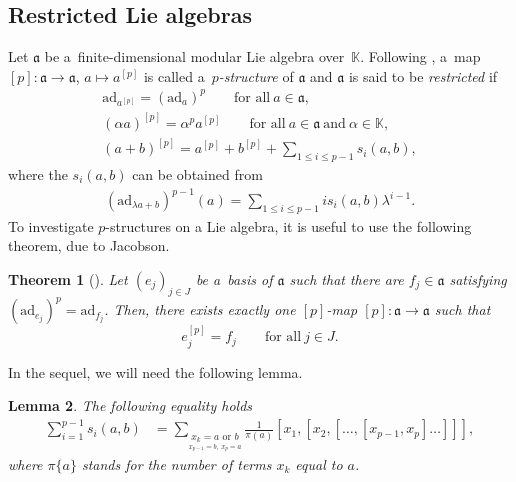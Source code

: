 \documentclass[10pt,a4paper]{amsart}
\numberwithin{equation}{section}
\newtheorem{Theorem}{Theorem}[section]
\newtheorem{Lemma}[Theorem]{Lemma}
\begin{document}
\subsection{Restricted Lie algebras}%
Let $\mathfrak{a}$ be a~finite-dimensional modular Lie algebra over~$\mathbb{K}$. Following \cite{J, SF}, a~map $[p]\colon \mathfrak{a}\rightarrow \mathfrak{a}$, $a\mapsto a^{[p]}$ is called a~\textit{$p$-structure} of $\mathfrak{a}$ and $\mathfrak{a}$ is said to be {\it restricted} if
\begin{gather*}
\mathrm{ad}_{a^{[p]}}=(\mathrm{ad}_a)^p \qquad \text{for all} \ a \in \mathfrak{a},\\
(\alpha a)^{[p]}=\alpha^p a^{[p]}\qquad \text{for all}\ a\in \mathfrak{a} \ \text{and} \ \alpha \in \mathbb{K},\\
(a+b)^{[p]}=a^{[p]}+b^{[p]}+\sum_{1\leq i\leq p-1}s_i(a,b),
\end{gather*}
where the $s_i(a,b)$ can be obtained from
\begin{gather*}%
(\mathrm{ad}_{\lambda a+b})^{p-1}(a)= \sum_{1\leq i \leq p-1} is_i(a,b) \lambda^{i-1}.
\end{gather*}
To investigate $p$-structures on a Lie algebra, it is useful to use the following theorem, due to Jacobson.
\begin{Theorem}[\cite{J}] \label{Jac}
Let $(e_j)_{j\in J}$ be a~basis of $\mathfrak{a}$ such that there are $f_j\!\!\in \!\mathfrak{a}$ satisfying ${(\mathrm{ad}_{e_j})^p\!=\!\mathrm{ad}_{f_j}}$. Then, there exists exactly one $[p]$-map $[p]\colon\mathfrak{a}\rightarrow \mathfrak{a}$ such that
\[
e_j^{[p]}=f_j \qquad \text{for all}\ j\in J.
\]
\end{Theorem}
In the sequel, we will need the following lemma.
\begin{Lemma}\label{1lemma}
The following equality holds
\begin{align*}\label{si}
\sum_{i=1}^{p-1}s_i(a,b)&=\sum_{\underset{x_{p-1}=b,~x_p=a}{x_k=a \text{ or } b}}\frac{1}{\pi(a)}[x_1,[x_2,[\dots ,[x_{p-1},x_p]\dots ]]],
\end{align*}
where $\pi\{a\}$ stands for the number of terms $x_k$ equal to $a$.
\end{Lemma}
\end{document}
